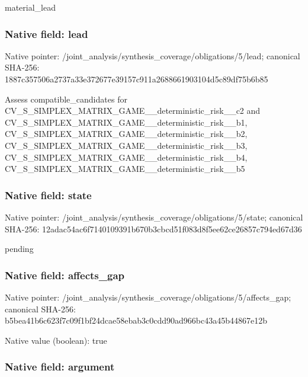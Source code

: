 \documentclass[10pt,a4paper]{article}
\begin{document}
material\_lead


\subsubsection{Native field: lead}


Native pointer: /joint\_analysis/synthesi\allowbreak{}s\_coverage/obligations/5\allowbreak{}/lead; canonical SHA-256: 1887c357506a2737a33e3726\allowbreak{}77e39157c911a26886619031\allowbreak{}04d5c89df75b6b85


Assess compatible\_candidates for CV\_S\_SIMPLEX\_MATRIX\_GAME\allowbreak{}\_\_deterministic\_risk\_\_c2 and CV\_S\_SIMPLEX\_MATRIX\_GAME\allowbreak{}\_\_deterministic\_risk\_\_b1\allowbreak{}, CV\_S\_SIMPLEX\_MATRIX\_GAME\allowbreak{}\_\_deterministic\_risk\_\_b2\allowbreak{}, CV\_S\_SIMPLEX\_MATRIX\_GAME\allowbreak{}\_\_deterministic\_risk\_\_b3\allowbreak{}, CV\_S\_SIMPLEX\_MATRIX\_GAME\allowbreak{}\_\_deterministic\_risk\_\_b4\allowbreak{}, CV\_S\_SIMPLEX\_MATRIX\_GAME\allowbreak{}\_\_deterministic\_risk\_\_b5


\subsubsection{Native field: state}


Native pointer: /joint\_analysis/synthesi\allowbreak{}s\_coverage/obligations/5\allowbreak{}/state; canonical SHA-256: 12adac54ac6f7140109391b6\allowbreak{}70b3cbcd51f083d8f5ee62ce\allowbreak{}26857c794ed67d36


pending


\subsubsection{Native field: affects\_gap}


Native pointer: /joint\_analysis/synthesi\allowbreak{}s\_coverage/obligations/5\allowbreak{}/affects\_gap; canonical SHA-256: b5bea41b6c623f7c09f1bf24\allowbreak{}dcae58ebab3c0cdd90ad966b\allowbreak{}c43a45b44867e12b



Native value (boolean): true



\subsubsection{Native field: argument}
\end{document}
